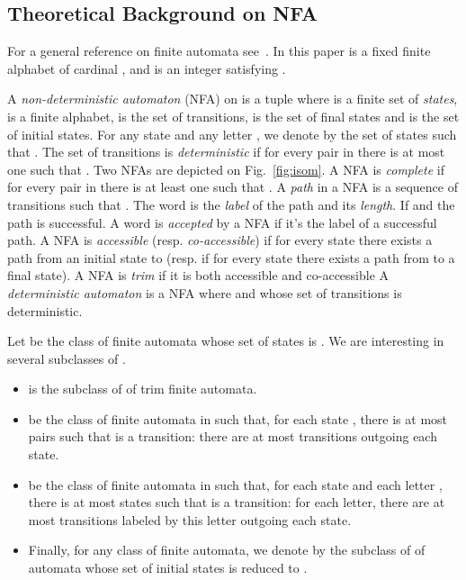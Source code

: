\subsection{Theoretical Background on NFA}\label{sec:theoryNFA}


For a general reference on finite automata see~\cite{Hopcroft}.  In
this paper  is a fixed finite alphabet of cardinal
, and  is an integer satisfying .

A {\it non-deterministic automaton} (NFA) on  is a tuple  where  is a finite set of {\it states},  is a finite
alphabet,  is the set of
transitions,  is the set of final states and  is the set of initial states.  For any state  and any letter
, we denote by  the set of states  such that
.  The set of transitions  is {\it
deterministic} if for every pair  in  there is
at most one  such that . Two NFAs are
depicted on Fig.~\ref{fig:isom}.  A NFA is {\it complete} if for every
pair  in  there is at least one  such
that .  A {\it path} in a NFA is a sequence of
transitions  such that
. The word  is the {\it label} of the path
and  its {\it length}. If  and  the path is
successful. A word is {\it accepted} by a NFA if it's the label of a
successful path.  A NFA is {\it accessible} (resp.  {\it
co-accessible}) if for every state  there exists a path from an
initial state to  (resp. if for every state  there exists a path
from  to a final state).  A NFA is {\it trim} if it is both
accessible and co-accessible A {\it deterministic automaton} is a NFA
where  and whose set of transitions is deterministic.

Let  be the class of  finite automata whose set of states is
. We are interesting in several subclasses of .
\begin{itemize}
\item  is the subclass of  of trim finite automata.
\item   be the class of
finite automata in   such that, for each state , there is at most 
pairs  such that  is a transition: there are at most 
transitions outgoing each state. 
\item  be the class of
finite automata in   such that, for each state  and each
letter , there is at most 
states  such that  is a transition: for each letter, there are
at most  transitions labeled by this letter  outgoing each state.
\item Finally, for any class  of finite automata, we denote by  the
subclass of  of automata whose set of initial states is reduced to
.  
\end{itemize}

